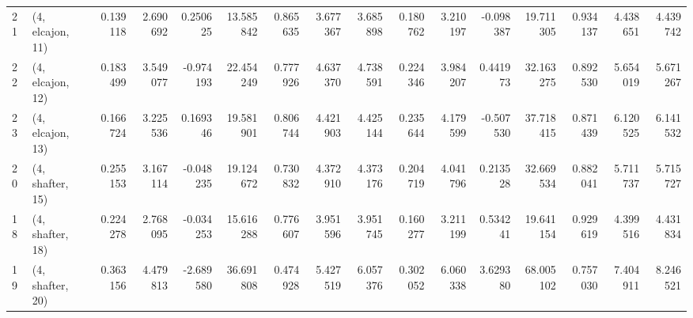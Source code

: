 \begin{tabular}{llrrrrrrrrrrrrrr}
21 &  (4, elcajon, 11) &   0.139118 &  2.690692 &  0.250625 &  13.585842 &  0.865635 &   3.677367 &  3.685898 &  0.180762 &  3.210197 & -0.098387 &   19.711305 &  0.934137 &   4.438651 &   4.439742 \\
22 &  (4, elcajon, 12) &   0.183499 &  3.549077 & -0.974193 &  22.454249 &  0.777926 &   4.637370 &  4.738591 &  0.224346 &  3.984207 &  0.441973 &   32.163275 &  0.892530 &   5.654019 &   5.671267 \\
23 &  (4, elcajon, 13) &   0.166724 &  3.225536 &  0.169346 &  19.581901 &  0.806744 &   4.421903 &  4.425144 &  0.235644 &  4.179599 & -0.507530 &   37.718415 &  0.871439 &   6.120525 &   6.141532 \\
20 &  (4, shafter, 15) &   0.255153 &  3.167114 & -0.048235 &  19.124672 &  0.730832 &   4.372910 &  4.373176 &  0.204719 &  4.041796 &  0.213528 &   32.669534 &  0.882041 &   5.711737 &   5.715727 \\
18 &  (4, shafter, 18) &   0.224278 &  2.768095 & -0.034253 &  15.616288 &  0.776607 &   3.951596 &  3.951745 &  0.160277 &  3.211199 &  0.534241 &   19.641154 &  0.929619 &   4.399516 &   4.431834 \\
19 &  (4, shafter, 20) &   0.363156 &  4.479813 & -2.689580 &  36.691808 &  0.474928 &   5.427519 &  6.057376 &  0.302052 &  6.060338 &  3.629380 &   68.005102 &  0.757030 &   7.404911 &   8.246521 \\
\bottomrule
\end{tabular}
